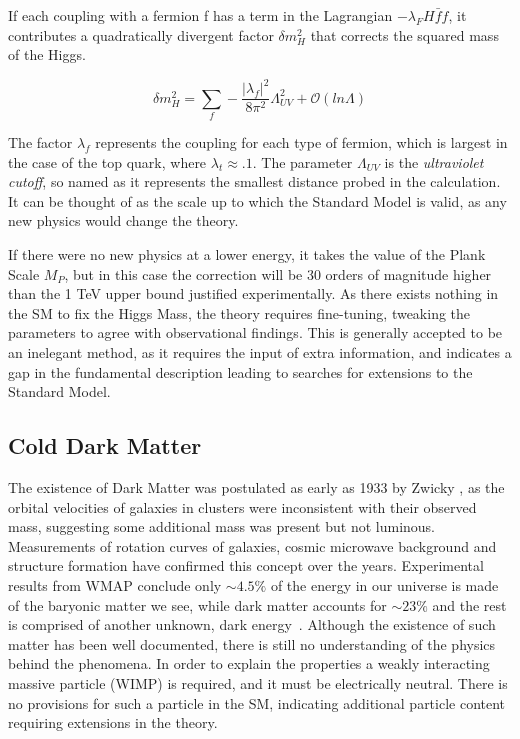 If each coupling with a fermion f has a term in the Lagrangian $-\lambda_{F} H \bar{f}f$, it contributes a quadratically divergent factor $\delta m^{2}_{H}$ that corrects the squared mass of the Higgs. 

\begin{equation}
\delta m^{2}_{H} =\sum_{f} - \frac{|\lambda_{f}|^{2}}{8 \pi^{2}}\Lambda^{2}_{UV} + \mathcal{O}(ln\Lambda)
\label{eqn:HIGGQUAD}
\end{equation}

The factor $\lambda_{f}$  represents the coupling for each type of fermion, which is largest in the case of the top quark, where $\lambda_{t} \approx. 1$. The parameter $\Lambda_{UV}$ is the \textit{ultraviolet cutoff}, so named as it represents the smallest distance probed in the calculation. It can be thought of as the scale up to which the Standard Model is valid, as any new physics would change the theory.

 If there were no new physics at a lower energy, it takes the value of the Plank Scale $M_{P}$, but in this case the correction will be 30 orders of magnitude higher than the 1 TeV upper bound justified experimentally\cite{Drees}. As there exists nothing in the SM to fix the Higgs Mass, the theory requires fine-tuning, tweaking the parameters to agree with observational findings. This is generally accepted to be an inelegant method, as it requires the input of extra information, and indicates a gap in the fundamental description leading to searches for extensions to the Standard Model. 

\subsection{Cold Dark Matter}

The existence of Dark Matter was postulated as early as 1933 by Zwicky \cite{zwicky}, as the orbital velocities of galaxies in clusters were inconsistent with their observed mass, suggesting some additional mass was present but not luminous.  Measurements of rotation curves of galaxies, cosmic microwave background and structure formation have confirmed this concept over the years. Experimental results from WMAP conclude only $\sim 4.5\%$ of the energy in our universe is made of the baryonic matter we see, while dark matter accounts for $\sim 23\%$ and the rest is comprised of another unknown, dark energy~\cite{WMAP5}. Although the existence of such matter has been well documented, there is still no understanding of the physics behind the phenomena. In order to explain the properties a weakly interacting massive particle (WIMP) is required, and it must be electrically neutral. There is no provisions for such a particle in the SM, indicating additional particle content requiring extensions in the theory. 

